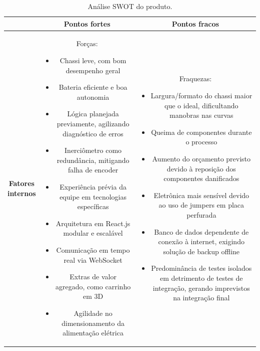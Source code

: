 \begin{table}[H]
\centering
\footnotesize
\caption{Análise SWOT do produto.}
\begin{tabular}{|c|c|c|} \hline
 & \textbf{Pontos fortes} & \textbf{Pontos fracos}  \\ \hline 
{\parbox{0.1\textwidth}{ \textbf{Fatores \\ internos}}}  &
{\parbox{0.4\textwidth}{ Forças: 
\begin{itemize}
    \item Chassi leve, com bom desempenho geral
    \item Bateria eficiente e boa autonomia
    \item Lógica planejada previamente, agilizando diagnóstico de erros
    \item Inerciômetro como redundância, mitigando falha de encoder
    \item Experiência prévia da equipe em tecnologias específicas
    \item Arquitetura em React.js modular e escalável
    \item Comunicação em tempo real via WebSocket
    \item Extras de valor agregado, como carrinho em 3D
    \item Agilidade no dimensionamento da alimentação elétrica
\end{itemize}}}
&
{\parbox{0.4\textwidth}{ Fraquezas:
\begin{itemize}
    \item Largura/formato do chassi maior que o ideal, dificultando manobras nas curvas
    \item Queima de componentes durante o processo
    \item Aumento do orçamento previsto devido à reposição dos componentes danificados
    \item Eletrônica mais sensível devido ao uso de jumpers em placa perfurada
    \item Banco de dados dependente de conexão à internet, exigindo solução de backup offline
    \item Predominância de testes isolados em detrimento de testes de integração, gerando imprevistos na integração final
\end{itemize}}}
\\ \hline


\end{tabular}
\end{table}
